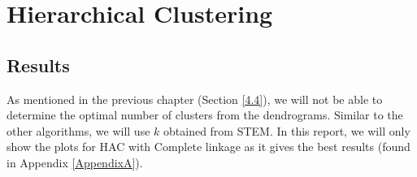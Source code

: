 
\section{Hierarchical Clustering}
\subsection{Results}
As mentioned in the previous chapter (Section \ref{4.4}), we will not be able to determine the optimal number of clusters from the dendrograms. Similar to the other algorithms, we will use $k$ obtained from STEM. In this report, we will only show the plots for HAC with Complete linkage as it gives the best results (found in Appendix \ref{AppendixA}).

